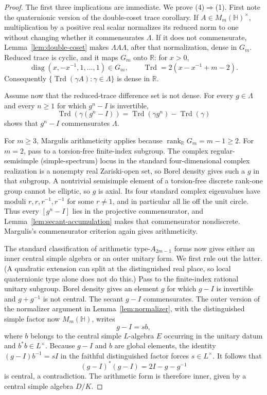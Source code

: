 \documentclass[11pt,reqno]{amsart}
\theoremstyle{definition}
\theoremstyle{remark}
\newcommand{\R}{\mathbb R}
\newcommand{\Trd}{\operatorname{Trd}}
\newcommand{\diag}{\operatorname{diag}}
\begin{document}
\begin{proof}
The first three implications are immediate.  We prove (4)\(\Rightarrow\)(1).
First note the quaternionic version of the double-coset trace corollary.  If
\(A\in M_m(\mathbb H)^\times\), multiplication by a positive real scalar
normalizes its reduced norm to one without changing whether it commensurates
\(\Lambda\).  If it does not commensurate, Lemma~\ref{lem:double-coset}
makes \(\Lambda A\Lambda\), after that normalization, dense in \(G_m\).
Reduced trace is cyclic, and it maps \(G_m\) onto \(\R\): for
\(x>0\),
\[
 \diag(x,-x^{-1},1,\ldots,1)\in G_m,
 \qquad
 \Trd=2(x-x^{-1}+m-2).
\tag{7.2}
\]
Consequently \(\{\Trd(\gamma A):\gamma\in\Lambda\}\) is dense in \(\R\).

Assume now that the reduced-trace difference set is not dense.  For every
\(g\in\Lambda\) and every \(n\ge1\) for which \(g^n-I\) is invertible,
\[
 \Trd(\gamma(g^n-I))=\Trd(\gamma g^n)-\Trd(\gamma)
\]
shows that \(g^n-I\) commensurates \(\Lambda\).

For \(m\ge3\), Margulis arithmeticity \cite[Chapter~IX]{Margulis} applies because
\(\operatorname{rank}_\R G_m=m-1\ge2\).  For \(m=2\), pass to a torsion-free
finite-index subgroup.  The complex regular-semisimple (simple-spectrum) locus
in the standard four-dimensional complex realization is a nonempty real
Zariski-open set, so Borel density \cite{BorelDensity} gives such a \(g\) in that subgroup.
A nontrivial semisimple element of a torsion-free discrete rank-one group
cannot be elliptic, so \(g\) is axial.  Its four standard complex eigenvalues
have moduli \(r,r,r^{-1},r^{-1}\) for some \(r\ne1\), and in particular all
lie off the unit circle.  Thus every \([g^n-I]\) lies in the projective
commensurator, and
Lemma~\ref{lem:secant-accumulation} makes that commensurator nondiscrete.
Margulis's commensurator criterion \cite[Chapter~IX]{Margulis} again gives
arithmeticity.

  The standard classification of arithmetic type-\(A_{2m-1}\) forms
  \cite{PlatonovRapinchuk} now gives
either an inner central simple algebra or an outer unitary form.  We first rule
out the latter.  (A quadratic extension can split at the distinguished real
place, so local quaternionic type alone does not do this.)  Pass to the
finite-index rational unitary subgroup.  Borel density
\cite{BorelDensity} gives an element
\(g\) for which \(g-I\) is invertible and \(g+g^{-1}\) is not central.  The
secant \(g-I\) commensurates.  The outer version of the normalizer argument in
Lemma~\ref{lem:normalizer}, with the distinguished simple factor now
\(M_m(\mathbb H)\), writes
\[
 g-I=s b,
 \]
where \(b\) belongs to the central simple \(L\)-algebra \(E\) occurring in
the unitary datum and
\(b^*b\in L^\times\).  Because \(g-I\) and \(b\) are global elements, the
identity \((g-I)b^{-1}=sI\) in the faithful distinguished factor forces
\(s\in L^\times\).  It follows that
\[
 (g-I)^*(g-I)=2I-g-g^{-1}
\]
is central, a contradiction.  The arithmetic form is therefore inner, given
by a central simple algebra \(D/K\).


\end{proof}
\end{document}
